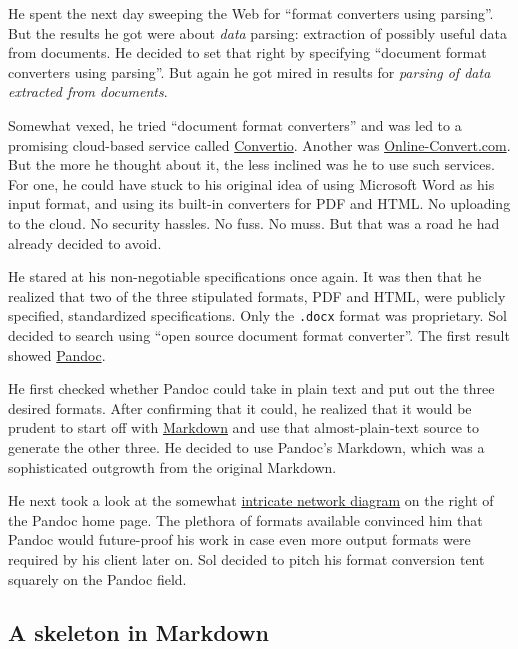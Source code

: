 \documentclass[
  british,
  a4paper,
  rgb,
  dvipsnames,
  svgnames,
  hyphens]{article}
\begin{document}
He spent the next day sweeping the Web for ``format converters using
parsing''. But the results he got were about \emph{data} parsing:
extraction of possibly useful data from documents. He decided to set
that right by specifying ``document format converters using parsing''.
But again he got mired in results for \emph{parsing of data extracted
from documents}.

Somewhat vexed, he tried ``document format converters'' and was led to a
promising cloud-based service called
\href{https://convertio.co/document-converter/}{Convertio}. Another was
\href{https://document.online-convert.com/}{Online-Convert.com}. But the
more he thought about it, the less inclined was he to use such services.
For one, he could have stuck to his original idea of using Microsoft
Word as his input format, and using its built-in converters for PDF and
HTML. No uploading to the cloud. No security hassles. No fuss. No muss.
But that was a road he had already decided to avoid.

He stared at his non-negotiable specifications once again. It was then
that he realized that two of the three stipulated formats, PDF and HTML,
were publicly specified, standardized specifications. Only the
\texttt{.docx} format was proprietary. Sol decided to search using
``open source document format converter''. The first result showed
\href{https://pandoc.org/}{Pandoc}.

He first checked whether Pandoc could take in plain text and put out the
three desired formats. After confirming that it could, he realized that
it would be prudent to start off with
\href{https://daringfireball.net/projects/markdown/}{Markdown} and use
that almost-plain-text source to generate the other three. He decided to
use Pandoc's Markdown, which was a sophisticated outgrowth from the
original Markdown.

He next took a look at the somewhat
\href{https://pandoc.org/diagram.svg}{intricate network diagram} on the
right of the Pandoc home page. The plethora of formats available
convinced him that Pandoc would future-proof his work in case even more
output formats were required by his client later on. Sol decided to
pitch his format conversion tent squarely on the Pandoc field.

\hypertarget{a-skeleton-in-markdown}{%
\subsection{A skeleton in Markdown}\label{a-skeleton-in-markdown}}
\end{document}
